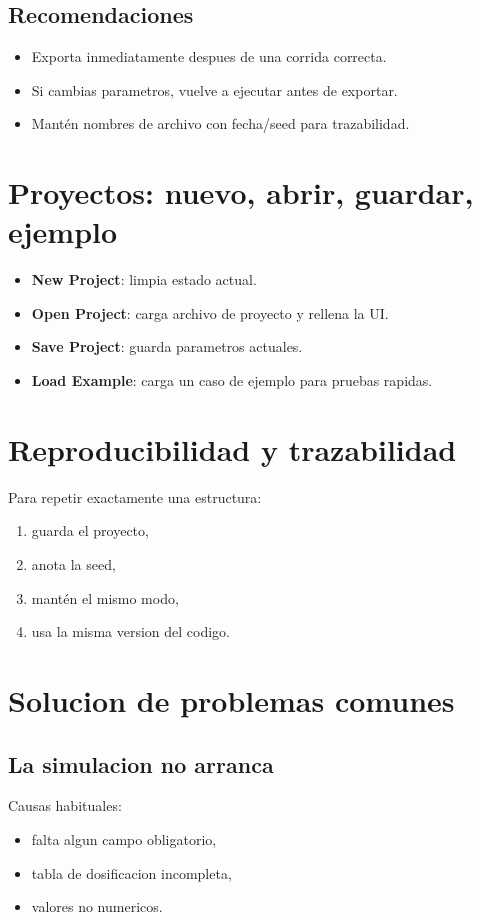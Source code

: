 \documentclass[11pt,a4paper]{article}
\begin{document}
\subsection{Recomendaciones}
\begin{itemize}[leftmargin=1.5em]
  \item Exporta inmediatamente despues de una corrida correcta.
  \item Si cambias parametros, vuelve a ejecutar antes de exportar.
  \item Mantén nombres de archivo con fecha/seed para trazabilidad.
\end{itemize}

\section{Proyectos: nuevo, abrir, guardar, ejemplo}
\begin{itemize}[leftmargin=1.5em]
  \item \textbf{New Project}: limpia estado actual.
  \item \textbf{Open Project}: carga archivo de proyecto y rellena la UI.
  \item \textbf{Save Project}: guarda parametros actuales.
  \item \textbf{Load Example}: carga un caso de ejemplo para pruebas rapidas.
\end{itemize}

\section{Reproducibilidad y trazabilidad}
Para repetir exactamente una estructura:
\begin{enumerate}[leftmargin=1.7em]
  \item guarda el proyecto,
  \item anota la seed,
  \item mantén el mismo modo,
  \item usa la misma version del codigo.
\end{enumerate}

\section{Solucion de problemas comunes}
\subsection{La simulacion no arranca}
Causas habituales:
\begin{itemize}[leftmargin=1.5em]
  \item falta algun campo obligatorio,
  \item tabla de dosificacion incompleta,
  \item valores no numericos.
\end{itemize}
\end{document}
